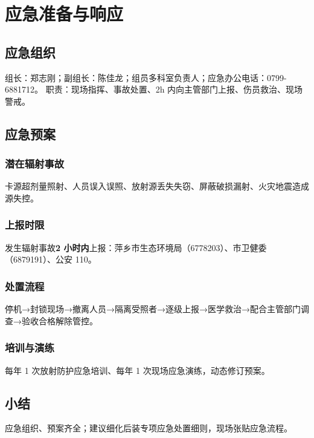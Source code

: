 \chapter{应急准备与响应}

\section{应急组织}

组长：郑志刚；副组长：陈佳龙；组员多科室负责人；应急办公电话：0799-6881712。
职责：现场指挥、事故处置、2h 内向主管部门上报、伤员救治、现场警戒。

\section{应急预案}

\subsection{潜在辐射事故}

卡源超剂量照射、人员误入误照、放射源丢失失窃、屏蔽破损漏射、火灾地震造成源失控。

\subsection{上报时限}

发生辐射事故\textbf{2 小时内}上报：萍乡市生态环境局（6778203）、市卫健委（6879191）、公安 110。

\subsection{处置流程}

停机→封锁现场→撤离人员→隔离受照者→逐级上报→医学救治→配合主管部门调查→验收合格解除管控。

\subsection{培训与演练}

每年 1 次放射防护应急培训、每年 1 次现场应急演练，动态修订预案。

\section{小结}

应急组织、预案齐全；建议细化后装专项应急处置细则，现场张贴应急流程。
